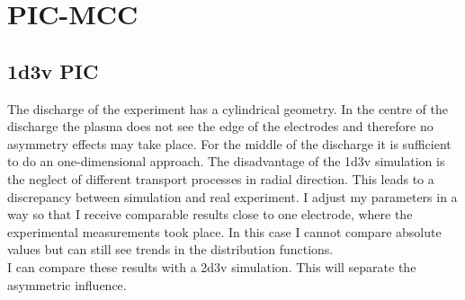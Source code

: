 
\section{PIC-MCC}

\subsection{1d3v PIC}
The discharge of the experiment has a cylindrical geometry.
In the centre of the discharge the plasma does not see the edge of the electrodes and therefore no asymmetry effects may take place. 
For the middle of the discharge it is sufficient to do an one-dimensional approach.
The disadvantage of the 1d3v simulation is the neglect of different transport processes in radial direction. 
This leads to a discrepancy between simulation and real experiment.
I adjust my parameters in a way so that I receive comparable results close to one electrode, where the experimental measurements took place.
In this case I cannot compare absolute values but can still see trends in the distribution functions.\\
I can compare these results with a 2d3v simulation.
This will separate the asymmetric influence.

